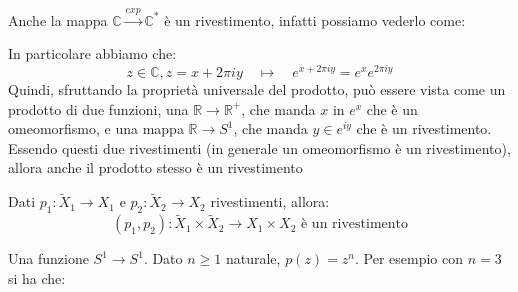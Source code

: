 \documentclass[11pt, a4paper, twoside]{article}
\begin{document}
\begin{es}
	Anche la mappa $\mathbb C \xrightarrow{exp} \mathbb C^*$ è un rivestimento, infatti possiamo vederlo come:
	\begin{center}
	\end{center}
	In particolare abbiamo che:
	\[ z \in \mathbb C, z = x + 2\pi i y \quad \mapsto \quad e^{x + 2\pi iy} = e^{x} e^{2 \pi i y} \]
	Quindi, sfruttando la proprietà universale del prodotto, può essere vista come un prodotto di due funzioni, una $\mathbb R \to \mathbb R^+$, che manda $x$ in $e^x$ che è un omeomorfismo, e una mappa $\mathbb R \to S^1$, che manda $y \in e^{i y}$ che è un rivestimento. Essendo questi due rivestimenti (in generale un omeomorfismo è un rivestimento), allora anche il prodotto stesso è un rivestimento
\end{es}

\begin{ese}
	Dati $p_1:\tilde X_1 \to X_1$ e $p_2:\tilde X_2 \to X_2$ rivestimenti, allora:
	\[ (p_1,p_2):\tilde X_1 \times \tilde X_2 \to X_1\times X_2 \text{ è un rivestimento} \]
\end{ese}

\begin{es}
	Una funzione $S^1 \to S^1$. Dato $n\geq 1$ naturale, $p(z) = z^n$. Per esempio con $n=3$ si ha che:
	\begin{center}
	\end{center}
\end{es}
\end{document}
